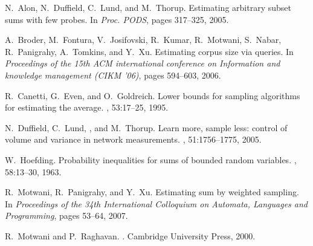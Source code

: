 \documentclass[runningheads]{llncs}
\begin{document}
\begin{thebibliography}{1}

N.~Alon, N.~Duffield, C.~Lund, and M.~Thorup.
\newblock Estimating arbitrary subset sums with few probes.
\newblock In {\em Proc. PODS}, pages 317--325, 2005.

A.~Broder, M.~Fontura, V.~Josifovski, R.~Kumar, R.~Motwani,
S.~Nabar,
  R.~Panigrahy, A.~Tomkins, and Y.~Xu.
\newblock Estimating corpus size via queries.
\newblock In {\em Proceedings of the 15th ACM international conference on
  Information and knowledge management (CIKM '06)}, pages 594--603, 2006.

R.~Canetti, G.~Even, and O.~Goldreich.
\newblock Lower bounds for sampling algorithms for estimating the average.
, 53:17--25, 1995.

N.~Duffield, C.~Lund, , and M.~Thorup.
\newblock Learn more, sample less: control of volume and variance in network
  measurements.
, 51:1756--1775, 2005.

W.~Hoefding.
\newblock Probability inequalities for sums of bounded random variables.
, 58:13--30,
  1963.

R.~Motwani, R.~Panigrahy, and Y.~Xu.
\newblock Estimating sum by weighted sampling.
\newblock In {\em Proceedings of the 34th International Colloquium on Automata,
  Languages and Programming}, pages 53--64, 2007.

R.~Motwani and P.~Raghavan.
.
\newblock Cambridge University Press, 2000.

\end{thebibliography}
\end{document}
